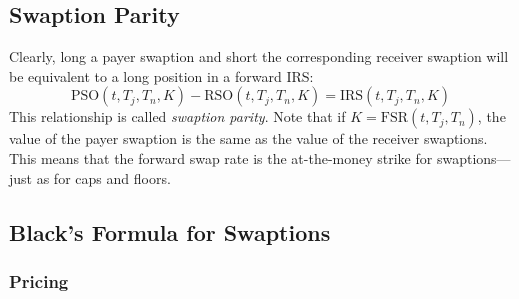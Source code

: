 \documentclass[a4paper,12pt]{scrartcl}
\begin{document}
\subsection{Swaption Parity}

Clearly, long a payer swaption and short the corresponding receiver 
swaption will be equivalent to a long position in a forward IRS:
   \[ \text{PSO}(t,T_j,T_n,K) - \text{RSO}(t,T_j,T_n,K) = 
      \text{IRS}(t,T_j,T_n,K) \]
This relationship is called \emph{swaption parity}. Note that if 
$K=\text{FSR}(t,T_j,T_n)$, the value of the payer swaption is the same as
the value of the receiver swaptions. This means that the forward swap
rate is the at-the-money strike for swaptions---just as for caps and
floors.

\newpage
\subsection{Black's Formula for Swaptions}

\subsubsection{Pricing}
\end{document}
